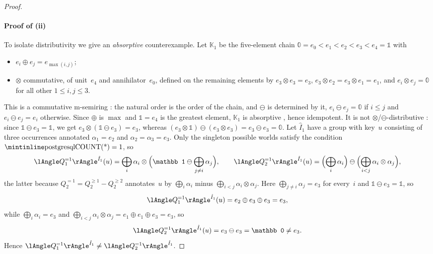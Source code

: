 \begin{proof}
\paragraph*{Proof of (ii)}
To isolate distributivity we give an \emph{absorptive} counterexample.
Let $\mathbb K_1$ be the five-element chain
$\mathbb 0=e_0<e_1<e_2<e_3<e_4=\mathbb 1$ with
\begin{itemize}
  \item $e_i\oplus e_j=e_{\max(i,j)}$;
  \item $\otimes$ commutative, of unit~$e_4$ and annihilator~$e_0$, defined on the remaining elements by $e_3\otimes e_3=e_3$, $e_3\otimes e_2=e_3\otimes e_1=e_1$, and $e_i\otimes e_j=\mathbb 0$ for all other $1\le i,j\le 3$.
\end{itemize}
This is a commutative m-semiring
: the
natural order is the order of the chain, and $\ominus$ is determined by
it, $e_i\ominus e_j=\mathbb 0$ if $i\le j$ and $e_i\ominus e_j=e_i$
otherwise.
Since $\oplus$ is $\max$ and $\mathbb 1=e_4$ is the greatest element,
$\mathbb K_1$ is absorptive ,
hence idempotent. It is not $\otimes$/$\ominus$-distributive
: since
$\mathbb 1\ominus e_3=\mathbb 1$, we get
$e_3\otimes(\mathbb 1\ominus e_3)=e_3$, whereas
$(e_3\otimes\mathbb 1)\ominus(e_3\otimes e_3)=e_3\ominus e_3=\mathbb 0$.
Let $\hat I_1$ have a group with
key~$u$ consisting of three occurrences annotated $\alpha_1=e_2$ and
$\alpha_2=\alpha_3=e_3$. Only the singleton possible worlds
satisfy the  condition $\text{\sql{COUNT(*)}}=1$, so
\[
\angsem{\hat I_1}{Q^{=1}_1}(u)
=\bigoplus_{i}\alpha_i\otimes\Bigl(\mathbb 1\ominus\bigoplus_{j\neq i}\alpha_j\Bigr),
\qquad
\angsem{\hat I_1}{Q^{=1}_2}(u)
=\Bigl(\bigoplus_i\alpha_i\Bigr)\ominus\Bigl(\bigoplus_{i<j}\alpha_i\otimes\alpha_j\Bigr),
\]
the latter because $Q^{=1}_2=Q^{\ge1}_2-Q^{\ge2}_2$ annotates~$u$ by
$\bigoplus_i\alpha_i$ minus $\bigoplus_{i<j}\alpha_i\otimes\alpha_j$.
Here $\bigoplus_{j\neq i}\alpha_j=e_3$ for every~$i$ and
$\mathbb 1\ominus e_3=\mathbb 1$, so
\[
\angsem{\hat I_1}{Q^{=1}_1}(u)
=e_2\oplus e_3\oplus e_3=e_3,
\]
while $\bigoplus_i\alpha_i=e_3$ and
$\bigoplus_{i<j}\alpha_i\otimes\alpha_j=e_1\oplus e_1\oplus e_3=e_3$, so
\[
\angsem{\hat I_1}{Q^{=1}_2}(u)=e_3\ominus e_3=\mathbb 0\neq e_3.
\]
Hence $\angsem{\hat I_1}{Q^{=1}_1}\neq\angsem{\hat I_1}{Q^{=1}_2}$.

\end{proof}
